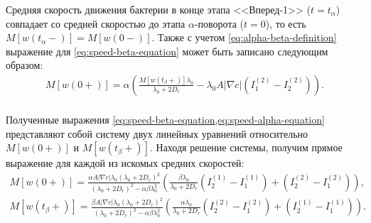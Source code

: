 Средняя скорость движения бактерии в конце этапа <<Вперед-1>> ($t=t_{\alpha}$) совпадает со средней скоростью до этапа $\alpha$-поворота ($t=0$), то есть $M\left [w(t_{\alpha}-) \right ]=M\left [w(0-) \right ]$. Также с учетом \cref{eq:alpha-beta-definition} выражение для \cref{eq:speed-beta-equation} может быть записано следующим образом:
\begin{equation}
    \begin{aligned}
        M\left [w(0+) \right ] = \alpha \left ( \frac{M\left [w(t_{\beta}+) \right ] \lambda_0}{\lambda_0 + 2 D_r} - \lambda_0 A |\nabla c| \left (I_1^{(2)} - I_2^{(2)} \right ) \right ). \\
        \label{eq:speed-alpha-equation}
    \end{aligned}
\end{equation}

Полученные выражения \cref{eq:speed-beta-equation,eq:speed-alpha-equation} представляют собой систему двух линейных уравнений относительно $M\left [w(0+) \right ]$ и $M\left [w(t_{\beta}+) \right ]$. Находя решение системы, получим прямое выражение для каждой из искомых средних скоростей:
\begin{equation}
    \begin{aligned}
        M\left [w(0+) \right ] = \frac{\alpha A |\nabla c|\lambda_0 (\lambda_0+2D_r)^2}{(\lambda_0+2D_r)^2-\alpha\beta\lambda_0^2} \left ( \frac{\beta \lambda_0}{\lambda_0+2D_r}\left (I_2^{(1)} - I_1^{(1)}\right ) + \left (I_2^{(2)} - I_1^{(2)}\right )\right ), \\
        M\left [w(t_{\beta}+) \right ] = \frac{\beta A |\nabla c|\lambda_0 (\lambda_0+2D_r)^2}{(\lambda_0+2D_r)^2-\alpha\beta\lambda_0^2} \left ( \frac{\alpha \lambda_0}{\lambda_0+2D_r}\left (I_2^{(2)} - I_1^{(2)}\right ) + \left (I_2^{(1)} - I_1^{(1)} \right )\right ). \\
        \label{eq:speed-alpha-beta-solution}
    \end{aligned}
\end{equation}

